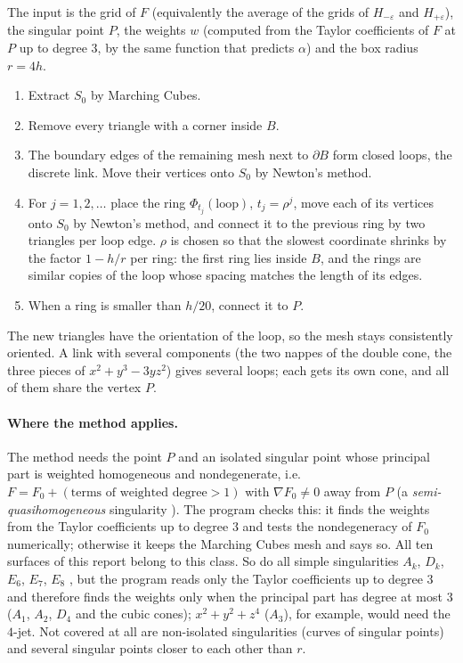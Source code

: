 \documentclass[12pt, a4paper]{article}
\theoremstyle{plain}
\theoremstyle{definition}
\theoremstyle{remark}
\theoremstyle{definition}
\begin{document}
The input is the grid of $F$ (equivalently the average of the grids of $H_{-\varepsilon}$
and $H_{+\varepsilon}$), the singular point $P$, the weights $w$ (computed from the
Taylor coefficients of $F$ at $P$ up to degree $3$, by the same function that predicts
$\alpha$) and the box radius $r=4h$.
\begin{enumerate}
    \item Extract $S_0$ by Marching Cubes.
    \item Remove every triangle with a corner inside $B$.
    \item The boundary edges of the remaining mesh next to $\partial B$ form closed
          loops, the discrete link. Move their vertices onto $S_0$ by Newton's
          method.
    \item For $j=1,2,\dots$ place the ring $\Phi_{t_j}(\text{loop})$, $t_j=\rho^j$,
          move each of its vertices onto $S_0$ by Newton's method, and connect it to
          the previous ring by two triangles per loop edge. $\rho$ is chosen so that
          the slowest coordinate shrinks by the factor $1-h/r$ per ring: the first
          ring lies inside $B$, and the rings are similar copies of the loop whose
          spacing matches the length of its edges.
    \item When a ring is smaller than $h/20$, connect it to $P$.
\end{enumerate}
The new triangles have the orientation of the loop, so the mesh stays consistently
oriented. A link with several components (the two nappes of the double cone, the
three pieces of $x^2+y^3-3yz^2$) gives several loops; each gets its own cone, and all
of them share the vertex $P$.

\paragraph{Where the method applies.} The method needs the point $P$ and an isolated
singular point whose principal part is weighted homogeneous and nondegenerate, i.e.\
$F=F_0+(\text{terms of weighted degree}>1)$ with $\nabla F_0\neq0$ away from $P$ (a
\emph{semi-quasihomogeneous} singularity \cite{arnold2012singularities}). The program
checks this: it finds the weights from the Taylor coefficients up to degree $3$ and
tests the nondegeneracy of $F_0$ numerically; otherwise it keeps the Marching Cubes
mesh and says so. All ten surfaces of this report belong to this class. So do all simple
singularities $A_k$, $D_k$, $E_6$, $E_7$, $E_8$ \cite{arnold2012singularities}, but the
program reads only the Taylor coefficients up to degree $3$ and therefore finds the
weights only when the principal part has degree at most $3$ ($A_1$, $A_2$, $D_4$ and
the cubic cones); $x^2+y^2+z^4$ ($A_3$), for example, would need the $4$-jet. Not
covered at all are non-isolated singularities (curves of singular points) and
several singular points closer to each other than $r$.
\end{document}
